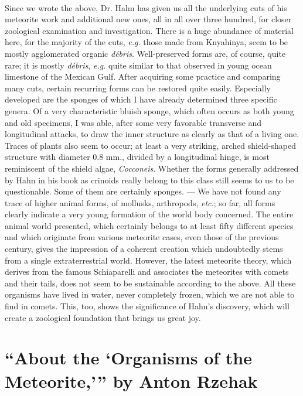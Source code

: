 \documentclass[a4paper, 12pt, oneside]{article}
\begin{document}
\paragraph*{}
Since we wrote the above, Dr. Hahn has given us all the underlying cuts of his meteorite work and additional new ones, all in all over three hundred, for closer zoological examination and investigation. There is a huge abundance of material here, for the majority of the cuts, \emph{e.g.} those made from Knyahinya, seem to be mostly agglomerated organic \emph{débris}. Well-preserved forms are, of course, quite rare; it is mostly \emph{débris}, \emph{e.g.} quite similar to that observed in young ocean limestone of the Mexican Gulf. After acquiring some practice and comparing many cuts, certain recurring forms can be restored quite easily. Especially developed are the sponges of which I have already determined three specific genera. Of a very characteristic bluish sponge, which often occurs as both young and old specimens, I was able, after some very favorable transverse and longitudinal attacks, to draw the inner structure as clearly as that of a living one. Traces of plants also seem to occur; at least a very striking, arched shield-shaped structure with diameter 0.8 mm., divided by a longitudinal hinge, is most reminiscent of the shield algae, \emph{Cocconeis}. Whether the forms generally addressed by Hahn in his book as crinoids really belong to this class still seems to us to be questionable. Some of them are certainly sponges. --- We have not found any trace of higher animal forms, of mollusks, arthropods, \emph{etc.}; so far, all forms clearly indicate a very young formation of the world body concerned. The entire animal world presented, which certainly belongs to at least fifty different species and which originate from various meteorite cases, even those of the previous century, gives the impression of a coherent creation which undoubtedly stems from a single extraterrestrial world. However, the latest meteorite theory, which derives from the famous Schiaparelli and associates the meteorites with comets and their tails, does not seem to be sustainable according to the above. All these organisms have lived in water, never completely frozen, which we are not able to find in comets. This, too, shows the significance of Hahn's discovery, which will create a zoological foundation that brings us great joy.
\clearpage
\section{``About the `Organisms of the Meteorite,''' by Anton Rzehak}
\end{document}
